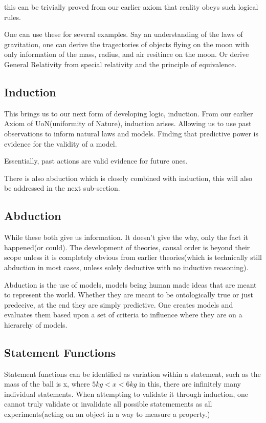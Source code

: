 this can be trivially proved from our earlier axiom that reality obeys such logical rules.

One can use these for several examples. Say an understanding of the laws of gravitation, one can derive the tragectories of objects flying on the moon with only information of the mass, radius, and air resitince on the moon. Or derive General Relativity from special relativity and the principle of equivalence.
\subsection{Induction}

This brings us to our next form of developing logic, induction. From our earlier Axiom of UoN(uniformity of Nature), induction arises. Allowing us to
use past observations to inform natural laws and models. Finding that predictive power is evidence for the validity of a model.

Essentially, past actions are valid evidence for future ones.

There is also abduction which is closely combined with induction, this will also be addressed in the next sub-section.

\subsection{Abduction}

While these both give us information. It doesn't give the why, only the fact it happened(or could). The development of theories, causal order is beyond their scope unless it is completely obvious from earlier theories(which is technically still abduction in most cases, unless solely deductive with no inductive reasoning).

Abduction is the use of models, models being human made ideas that are meant to represent the world. Whether they are meant to be ontologically true or just predecive, at the end they are simply predictive. One creates models and evaluates them based upon a set of criteria to influence where they are on a hierarchy of models.

\subsection{Statement Functions}

Statement functions can be identified as variation within a statement, such as the mass of the ball is x, where $5 kg < x < 6 kg$ in this, there are infinitely many individual statements. When attempting to validate it through induction, one cannot truly validate or invalidate all possible statemements as all experiments(acting on an object in a way to measure a property.)


